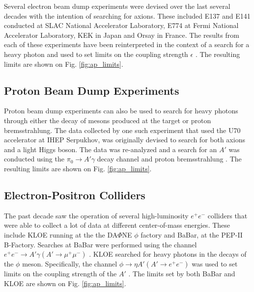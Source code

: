 Several electron beam dump experiments were devised over the last several decades with
the intention of searching for axions.  These included E137 \cite{bjorken1988}
and E141 \cite{riordan1987} conducted at SLAC National Accelerator Laboratory,
E774 \cite{bross1991} at Fermi National Accelerator Laboratory, 
KEK \cite{konaka1986} in Japan and Orsay \cite{davier1989} in France. 
The results from each of these experiments have been reinterpreted in the 
context of a search for a heavy photon and used to set limits on the coupling
strength $\epsilon$ \cite{bjorken2009, andreas2012}.  The resulting limits are 
shown on Fig. \ref{fig:ap_limits}.

\subsection{Proton Beam Dump Experiments}

Proton beam dump experiments can also be used to search for heavy photons
through either the decay of mesons produced at the target or proton
bremsstrahlung.  The data collected by one such experiment that used the U70
accelerator at IHEP Serpukhov, was originally devised to search for both axions
and a light Higgs boson.  The data was re-analyzed and a search for an $A'$ 
was conducted
using the $\pi_0 \rightarrow A'\gamma$ decay channel and proton bremsstrahlung
\cite{johannes2011, johannes2014}. The resulting limits are shown on Fig. 
\ref{fig:ap_limits}.

\subsection{Electron-Positron Colliders}

The past decade saw the operation of several high-luminosity $e^+e^-$ colliders 
that were able to collect a lot of data at different center-of-mass energies.
These include KLOE running at the the DA$\Phi$NE $\phi$ factory and BaBar, 
at the PEP-II B-Factory. Searches at BaBar were performed using the channel 
$e^+e^- \rightarrow A' \gamma (A' \rightarrow \mu^+\mu^-)$ 
\cite{Reece:2009un, Aubert:2009cp}.  KLOE 
searched for heavy photons in the decays of the $\phi$ meson.  Specifically, 
the channel $\phi \rightarrow \eta A' (A' \rightarrow e^+e^-)$ was used to
set limits on the coupling strength of the $A'$ 
\cite{Babusci:2012cr, Archilli:2011zc}.
The limits set by both BaBar and KLOE are shown on Fig. \ref{fig:ap_limits}.

